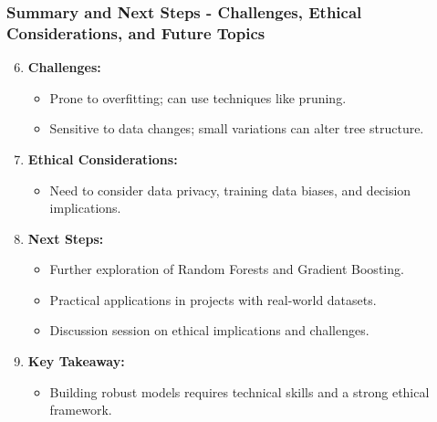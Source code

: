 \documentclass[aspectratio=169]{beamer}
\begin{document}
\begin{frame}[fragile]
    \frametitle{Summary and Next Steps - Challenges, Ethical Considerations, and Future Topics}

    \begin{enumerate}
        \setcounter{enumi}{5} %
        \item \textbf{Challenges:}
        \begin{itemize}
            \item Prone to overfitting; can use techniques like pruning.
            \item Sensitive to data changes; small variations can alter tree structure.
        \end{itemize}

        \item \textbf{Ethical Considerations:}
        \begin{itemize}
            \item Need to consider data privacy, training data biases, and decision implications.
        \end{itemize}

        \item \textbf{Next Steps:}
        \begin{itemize}
            \item Further exploration of Random Forests and Gradient Boosting.
            \item Practical applications in projects with real-world datasets.
            \item Discussion session on ethical implications and challenges.
        \end{itemize}
        
        \item \textbf{Key Takeaway:}
        \begin{itemize}
            \item Building robust models requires technical skills and a strong ethical framework.
        \end{itemize}
    \end{enumerate}
\end{frame}
\end{document}
